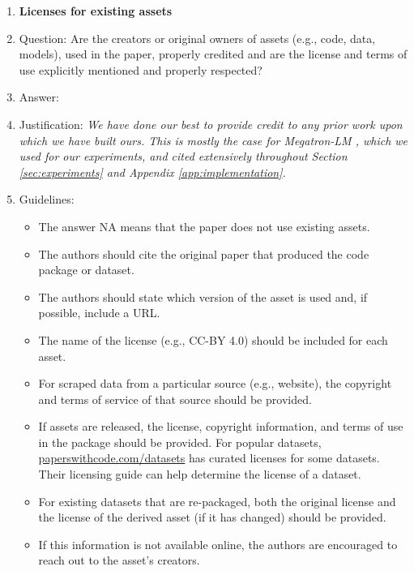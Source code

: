 \documentclass{article}
\theoremstyle{plain}
\begin{document}
\begin{enumerate}
\item {\bf Licenses for existing assets}
    \item[] Question: Are the creators or original owners of assets (e.g., code, data, models), used in the paper, properly credited and are the license and terms of use explicitly mentioned and properly respected?
    \item[] Answer: \answerYes %
    \item[] Justification: \textit{We have done our best to provide credit to any prior work upon which we have built ours. This is mostly the case for Megatron-LM \cite{shoeybi2020megatronlm}, which we used for our experiments, and cited extensively throughout Section \ref{sec:experiments} and Appendix \ref{app:implementation}.}
    \item[] Guidelines:
    \begin{itemize}
        \item The answer NA means that the paper does not use existing assets.
        \item The authors should cite the original paper that produced the code package or dataset.
        \item The authors should state which version of the asset is used and, if possible, include a URL.
        \item The name of the license (e.g., CC-BY 4.0) should be included for each asset.
        \item For scraped data from a particular source (e.g., website), the copyright and terms of service of that source should be provided.
        \item If assets are released, the license, copyright information, and terms of use in the package should be provided. For popular datasets, \url{paperswithcode.com/datasets} has curated licenses for some datasets. Their licensing guide can help determine the license of a dataset.
        \item For existing datasets that are re-packaged, both the original license and the license of the derived asset (if it has changed) should be provided.
        \item If this information is not available online, the authors are encouraged to reach out to the asset's creators.
    \end{itemize}


\end{enumerate}
\end{document}
